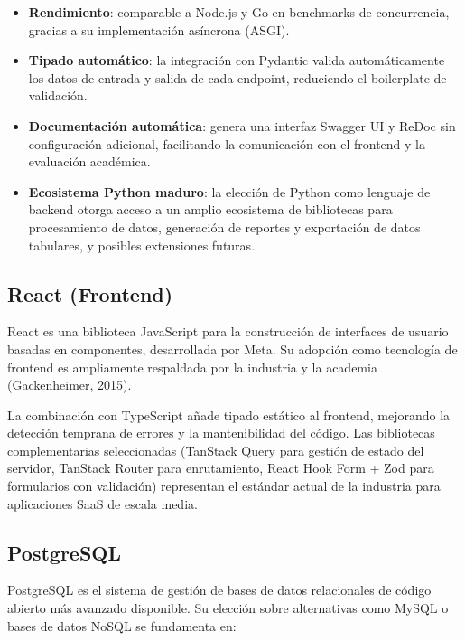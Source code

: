 \begin{itemize}
\tightlist
\item
  \textbf{Rendimiento}: comparable a Node.js y Go en benchmarks de concurrencia, gracias a su implementación asíncrona (ASGI).
\item
  \textbf{Tipado automático}: la integración con Pydantic valida automáticamente los datos de entrada y salida de cada endpoint, reduciendo el boilerplate de validación.
\item
  \textbf{Documentación automática}: genera una interfaz Swagger UI y ReDoc sin configuración adicional, facilitando la comunicación con el frontend y la evaluación académica.
\item
  \textbf{Ecosistema Python maduro}: la elección de Python como lenguaje de backend otorga acceso a un amplio ecosistema de bibliotecas para procesamiento de datos, generación de reportes y exportación de datos tabulares, y posibles extensiones futuras.
\end{itemize}

\subsection{React (Frontend)}\label{react-frontend}

React es una biblioteca JavaScript para la construcción de interfaces de usuario basadas en componentes, desarrollada por Meta. Su adopción como tecnología de frontend es ampliamente respaldada por la industria y la academia (Gackenheimer, 2015).

La combinación con TypeScript añade tipado estático al frontend, mejorando la detección temprana de errores y la mantenibilidad del código. Las bibliotecas complementarias seleccionadas (TanStack Query para gestión de estado del servidor, TanStack Router para enrutamiento, React Hook Form + Zod para formularios con validación) representan el estándar actual de la industria para aplicaciones SaaS de escala media.

\subsection{PostgreSQL}\label{postgresql}

PostgreSQL es el sistema de gestión de bases de datos relacionales de código abierto más avanzado disponible. Su elección sobre alternativas como MySQL o bases de datos NoSQL se fundamenta en:

